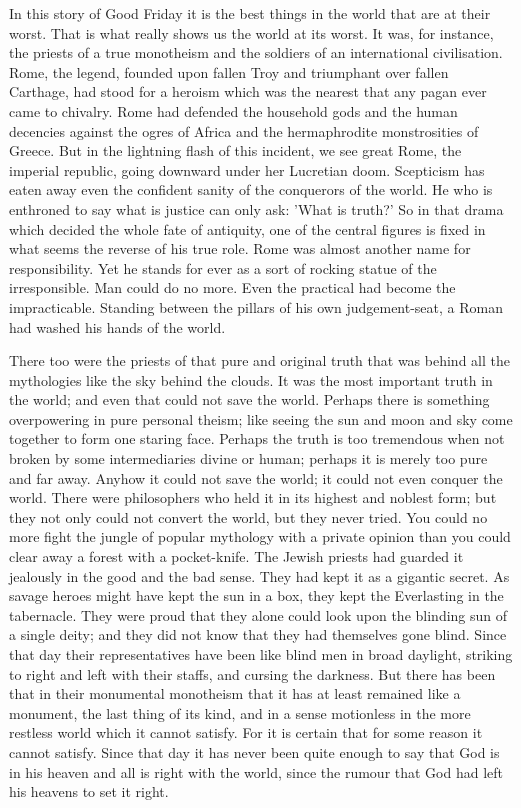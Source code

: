 In this story of Good Friday it is the best things in the world that are at their worst. That is what really shows us the world at its worst. It was, for instance, the priests of a true monotheism and the soldiers of an international civilisation. Rome, the legend, founded upon fallen Troy and triumphant over fallen Carthage, had stood for a heroism which was the nearest that any pagan ever came to chivalry. Rome had defended the household gods and the human decencies against the ogres of Africa and the hermaphrodite monstrosities of Greece. But in the lightning flash of this incident, we see great Rome, the imperial republic, going downward under her Lucretian doom. Scepticism has eaten away even the confident sanity of the conquerors of the world. He who is enthroned to say what is justice can only ask: 'What is truth?' So in that drama which decided the whole fate of antiquity, one of the central figures is fixed in what seems the reverse of his true role. Rome was almost another name for responsibility. Yet he stands for ever as a sort of rocking statue of the irresponsible. Man could do no more. Even the practical had become the impracticable. Standing between the pillars of his own judgement-seat, a Roman had washed his hands of the world.

There too were the priests of that pure and original truth that was behind all the mythologies like the sky behind the clouds. It was the most important truth in the world; and even that could not save the world. Perhaps there is something overpowering in pure personal theism; like seeing the sun and moon and sky come together to form one staring face. Perhaps the truth is too tremendous when not broken by some intermediaries divine or human; perhaps it is merely too pure and far away. Anyhow it could not save the world; it could not even conquer the world. There were philosophers who held it in its highest and noblest form; but they not only could not convert the world, but they never tried. You could no more fight the jungle of popular mythology with a private opinion than you could clear away a forest with a pocket-knife. The Jewish priests had guarded it jealously in the good and the bad sense. They had kept it as a gigantic secret. As savage heroes might have kept the sun in a box, they kept the Everlasting in the tabernacle. They were proud that they alone could look upon the blinding sun of a single deity; and they did not know that they had themselves gone blind. Since that day their representatives have been like blind men in broad daylight, striking to right and left with their staffs, and cursing the darkness. But there has been that in their monumental monotheism that it has at least remained like a monument, the last thing of its kind, and in a sense motionless in the more restless world which it cannot satisfy. For it is certain that for some reason it cannot satisfy. Since that day it has never been quite enough to say that God is in his heaven and all is right with the world, since the rumour that God had left his heavens to set it right.

